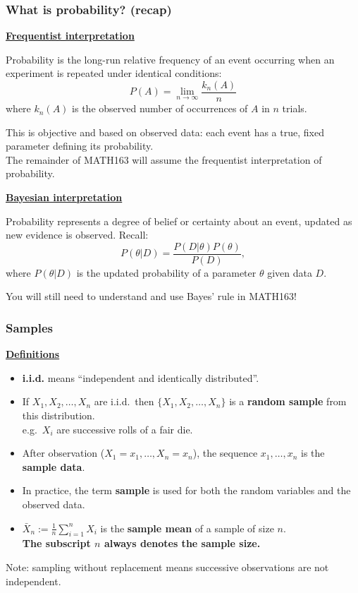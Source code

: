 \documentclass[t,8pt]{beamer}
\begin{document}
\begin{frame}
	\frametitle{What is probability? (recap)}
	{\bf\underline{Frequentist interpretation}} \par
	Probability is the long-run relative frequency of an event occurring when an experiment is repeated under identical conditions:
	\[
	P(A)=\lim_{n\rightarrow\infty}\frac{k_n(A)}{n}
	\]
	where $k_n(A)$ is the observed number of occurrences of $A$ in $n$ trials. \par
	{\small\color{NavyBlue}
		This is objective and based on observed data: each event has a true, fixed parameter defining its probability. \\
		The remainder of MATH163 will assume the frequentist interpretation of probability.
	} \par
	{\bf\underline{Bayesian interpretation}} \par
	Probability represents a degree of belief or certainty about an event, updated as new evidence is observed. Recall:
	\[
	P(\theta\vert D)=\frac{P(D\vert\theta)P(\theta)}{P(D)},
	\]
	where $P(\theta\vert D)$ is the updated probability of a parameter $\theta$ given data $D$. \par
	{\small\color{NavyBlue}
		You will still need to understand and use Bayes' rule in MATH163!
	}
\end{frame}

\begin{frame}
	\frametitle{Samples}
	{\bf\underline{Definitions}}
	\begin{itemize}
		\item {\bf i.i.d.} means ``independent and identically distributed''.
		\item If $X_1,X_2,\dots,X_n$ are i.i.d.\ then $\{X_1,X_2,\dots,X_n\}$ is a {\bf random sample} from this distribution.\\
		{\small\color{NavyBlue}
			e.g.\ $X_i$ are successive rolls of a fair die.
		}
		\item After observation ($X_1=x_1,\dots,X_n=x_n$), the sequence $x_1,\dots,x_n$ is the {\bf sample data}.
		\item In practice, the term {\bf sample} is used for both the random variables and the observed data.
		\item $\bar X_n:=\frac{1}{n}\sum_{i=1}^n X_i$ is the {\bf sample mean} of a sample of size $n$.\\
		{\bf The subscript $n$ always denotes the sample size.}
	\end{itemize}
	Note: sampling without replacement means successive observations are not independent.
\end{frame}
\end{document}

